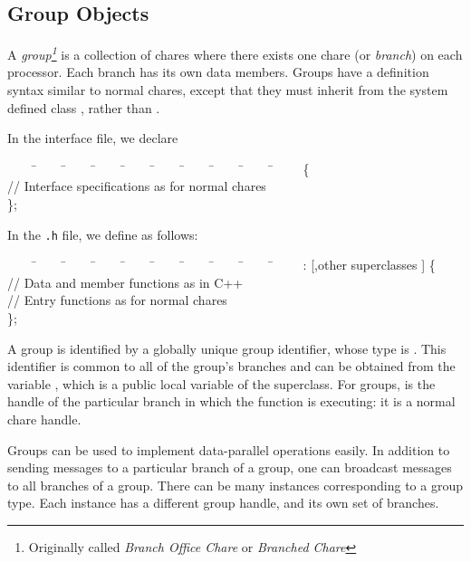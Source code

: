 \subsection{Group Objects}

A {\sl group\footnote{Originally called {\em Branch Office Chare} or 
{\em Branched Chare}}} is a collection of chares where 
there exists one chare (or {\sl branch}) on each
processor.   Each branch has its own data members.  Groups have
a definition syntax similar to normal chares, except that they must
inherit from the system defined class , rather than
.

In the interface file, we declare

\begin{tabbing}
~~~~ \=~~~~ \=~~~~ \=~~~~ \=~~~~ \=~~~~ \=~~~~ \=~~~~ \=~~~~ \=~~~~ \kill
\>   \{ \\
\> \>  // Interface specifications as for normal chares \\
\> \};
\end{tabbing}

In the {\tt .h} file, we define  as follows:

\begin{tabbing}
~~~~ \=~~~~ \=~~~~ \=~~~~ \=~~~~ \=~~~~ \=~~~~ \=~~~~ \=~~~~ \=~~~~ \kill
\>   :  [,other superclasses
] \{ \\
\> \> // Data and member functions as in C++ \\
\> \> // Entry functions as for normal chares \\
\> \};
\end{tabbing}

A group is identified by a globally unique group identifier, whose type is
. This identifier is common to all of the 
group's branches and can be obtained from the variable ,
which is a public local variable of the  
superclass.  For groups,   is the handle of 
the particular branch in which the function is executing: it is 
a normal chare handle.

Groups can be used to implement data-parallel operations easily.  In
addition to sending messages to a particular branch of a group, one
can broadcast messages to all branches of a group.  There can be many
instances corresponding to a group type.  Each instance has a
different group handle, and its own set of branches.

